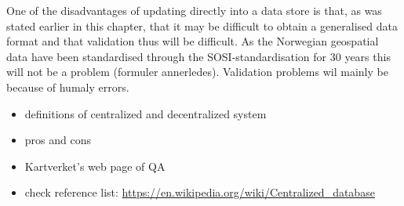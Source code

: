 One of the disadvantages of updating directly into a data store is that, as was stated earlier in this chapter, that it may be difficult to obtain a generalised data format and that validation thus will be difficult. As the Norwegian geospatial data have been standardised through the SOSI-standardisation for 30 years this will not be a problem (formuler annerledes). Validation problems wil mainly be because of humaly errors.    











\begin{itemize}
	\item definitions of centralized and decentralized system
	\item pros and cons
	\item Kartverket's web page of QA 
	\item check reference list: \url{https://en.wikipedia.org/wiki/Centralized_database} 
\end{itemize}


